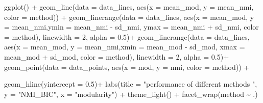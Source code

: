 \documentclass[
]{article}
\newenvironment{Shaded}{\begin{snugshade}}{\end{snugshade}}
\newcommand{\AttributeTok}[1]{\textcolor[rgb]{0.77,0.63,0.00}{#1}}
\newcommand{\DecValTok}[1]{\textcolor[rgb]{0.00,0.00,0.81}{#1}}
\newcommand{\FloatTok}[1]{\textcolor[rgb]{0.00,0.00,0.81}{#1}}
\newcommand{\FunctionTok}[1]{\textcolor[rgb]{0.00,0.00,0.00}{#1}}
\newcommand{\NormalTok}[1]{#1}
\newcommand{\SpecialCharTok}[1]{\textcolor[rgb]{0.00,0.00,0.00}{#1}}
\newcommand{\StringTok}[1]{\textcolor[rgb]{0.31,0.60,0.02}{#1}}
\begin{document}
\begin{Shaded}
\begin{Highlighting}[]
\FunctionTok{ggplot}\NormalTok{() }\SpecialCharTok{+}
    \FunctionTok{geom\_line}\NormalTok{(}\AttributeTok{data =}\NormalTok{ data\_lines, }\FunctionTok{aes}\NormalTok{(}\AttributeTok{x =}\NormalTok{ mean\_mod, }\AttributeTok{y =}\NormalTok{ mean\_nmi, }\AttributeTok{color =}\NormalTok{ method)) }\SpecialCharTok{+}
    \FunctionTok{geom\_linerange}\NormalTok{(}\AttributeTok{data =}\NormalTok{ data\_lines, }\FunctionTok{aes}\NormalTok{(}\AttributeTok{x =}\NormalTok{ mean\_mod, }\AttributeTok{y =}\NormalTok{ mean\_nmi,}\AttributeTok{ymin =}\NormalTok{ mean\_nmi }\SpecialCharTok{{-}}\NormalTok{ sd\_nmi, }\AttributeTok{ymax =}\NormalTok{ mean\_nmi }\SpecialCharTok{+}\NormalTok{ sd\_nmi, }\AttributeTok{color =}\NormalTok{ method), }\AttributeTok{linewidth =} \DecValTok{2}\NormalTok{, }\AttributeTok{alpha =} \FloatTok{0.5}\NormalTok{)}\SpecialCharTok{+}
    \FunctionTok{geom\_linerange}\NormalTok{(}\AttributeTok{data =}\NormalTok{ data\_lines, }\FunctionTok{aes}\NormalTok{(}\AttributeTok{x =}\NormalTok{ mean\_mod, }\AttributeTok{y =}\NormalTok{ mean\_nmi,}\AttributeTok{xmin =}\NormalTok{ mean\_mod }\SpecialCharTok{{-}}\NormalTok{ sd\_mod, }\AttributeTok{xmax =}\NormalTok{ mean\_mod }\SpecialCharTok{+}\NormalTok{ sd\_mod, }\AttributeTok{color =}\NormalTok{ method), }\AttributeTok{linewidth =} \DecValTok{2}\NormalTok{, }\AttributeTok{alpha =} \FloatTok{0.5}\NormalTok{)}\SpecialCharTok{+}
      \FunctionTok{geom\_point}\NormalTok{(}\AttributeTok{data =}\NormalTok{ data\_points, }\FunctionTok{aes}\NormalTok{(}\AttributeTok{x =}\NormalTok{ mod, }\AttributeTok{y =}\NormalTok{ nmi, }\AttributeTok{color =}\NormalTok{ method)) }\SpecialCharTok{+}

      \FunctionTok{geom\_hline}\NormalTok{(}\AttributeTok{yintercept =} \FloatTok{0.5}\NormalTok{)}\SpecialCharTok{+}
    \FunctionTok{labs}\NormalTok{(}\AttributeTok{title =} \StringTok{"performance of different methods "}\NormalTok{, }\AttributeTok{y =} \StringTok{"NMI\_BIC"}\NormalTok{, }\AttributeTok{x =} \StringTok{"modularity"}\NormalTok{) }\SpecialCharTok{+}
    \FunctionTok{theme\_light}\NormalTok{()  }\SpecialCharTok{+} \FunctionTok{facet\_wrap}\NormalTok{(method }\SpecialCharTok{\textasciitilde{}}\NormalTok{ .)}
\end{Highlighting}
\end{Shaded}
\end{document}
